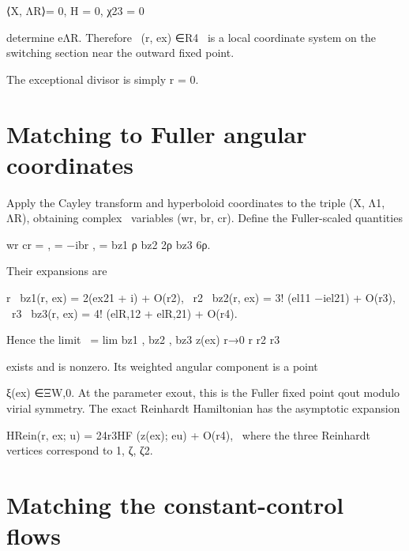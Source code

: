 \begin{displaytext}
⟨X, ΛR⟩= 0, H = 0, χ23 = 0
\end{displaytext}

\begin{displaytext}
determine eΛR. Therefore \
(r, ex) ∈R4 \
is a local coordinate system on the switching section near the outward fixed point.
\end{displaytext}

The exceptional divisor is simply r = 0.


\section{Matching to Fuller angular coordinates}

\begin{displaytext}
Apply the Cayley transform and hyperboloid coordinates to the triple (X, Λ1, ΛR), obtaining complex \
variables (wr, br, cr). Define the Fuller-scaled quantities
\end{displaytext}

\begin{displaytext}
wr cr = , = −ibr , = bz1 ρ bz2 2ρ bz3 6ρ.
\end{displaytext}

Their expansions are


\begin{displaytext}
r \
bz1(r, ex) = 2(ex21 + i) + O(r2), \
r2 \
bz2(r, ex) = 3! (el11 −iel21) + O(r3), \
r3 \
bz3(r, ex) = 4! (elR,12 + elR,21) + O(r4).
\end{displaytext}

\begin{displaytext}
Hence the limit \
= lim bz1 , bz2 , bz3 z(ex) r→0 r r2 r3
\end{displaytext}

exists and is nonzero. Its weighted angular component is a point


ξ(ex) ∈ΞW,0. At the parameter exout, this is the Fuller fixed point qout modulo virial symmetry. The exact Reinhardt Hamiltonian has the asymptotic expansion


\begin{displaytext}
HRein(r, ex; u) = 24r3HF (z(ex); eu) + O(r4), \
where the three Reinhardt vertices correspond to 1, ζ, ζ2.
\end{displaytext}

\section{Matching the constant-control flows}

